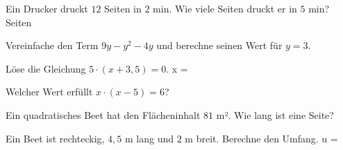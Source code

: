 \documentclass[11pt]{article}
\begin{document}
\noindent\begin{minipage}[t]{0.485\linewidth}\raggedright
\begin{aufgabe}{Ein Drucker druckt $12$ Seiten in $2$ min. Wie viele Seiten druckt er in $5$ min? \leerfeld Seiten}
\end{aufgabe}
\end{minipage}\hfill\begin{minipage}[t]{0.485\linewidth}\raggedright
\begin{aufgabe}{Vereinfache den Term $9y - y^2 - 4y$ und berechne seinen Wert für $y = 3$.}
\end{aufgabe}
\end{minipage}\par

\noindent\begin{minipage}[t]{0.485\linewidth}\raggedright
\begin{aufgabe}{Löse die Gleichung $5 \cdot (x + 3{,}5) = 0$. x = \leerfeld}
\end{aufgabe}
\end{minipage}\hfill\begin{minipage}[t]{0.485\linewidth}\raggedright
\begin{aufgabe}{Welcher Wert erfüllt $x \cdot (x - 5) = 6$? \\    }
\end{aufgabe}
\end{minipage}\par

\noindent\begin{minipage}[t]{0.485\linewidth}\raggedright
\begin{aufgabe}{Ein quadratisches Beet hat den Flächeninhalt $81$ m². Wie lang ist eine Seite? \leerfeld[m]}
\end{aufgabe}
\end{minipage}\hfill\begin{minipage}[t]{0.485\linewidth}\raggedright
\begin{aufgabe}{Ein Beet ist rechteckig, $4{,}5$ m lang und $2$ m breit. Berechne den Umfang. u = \leerfeld[m]}
\end{aufgabe}
\end{minipage}\par
\end{document}
